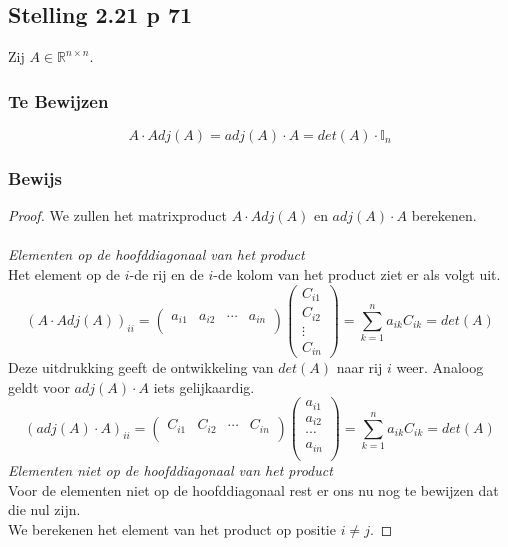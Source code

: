 \documentclass[lineaire_algebra_oplossingen.tex]{subfiles}
\begin{document}
\subsection{Stelling 2.21 p 71}
\label{2.21}
Zij $A \in \mathbb{R}^{n\times n}$.

\subsubsection*{Te Bewijzen}
\[
A\cdot Adj(A) = adj(A) \cdot A = det(A)\cdot\mathbb{I}_n
\]

\subsubsection*{Bewijs}
\begin{proof}
We zullen het matrixproduct $A\cdot Adj(A)$ en $adj(A) \cdot A$ berekenen.\\\\
\emph{Elementen op de hoofddiagonaal van het product}\\
Het element op de $i$-de rij en de $i$-de kolom van het product ziet er als volgt uit.
\[
(A\cdot Adj(A))_{ii} =
\begin{pmatrix}
a_{i1} & a_{i2}&\cdots&a_{in}\\
\end{pmatrix}
\begin{pmatrix}
C_{i1}\\C_{i2}\\\vdots\\C_{in}
\end{pmatrix}
=
\sum_{k=1}^na_{ik}C_{ik} = det(A)
\]
Deze uitdrukking geeft de ontwikkeling van $det(A)$ naar rij $i$ weer.
Analoog geldt voor $adj(A) \cdot A$ iets gelijkaardig.
\[
(adj(A) \cdot A)_{ii} =
\begin{pmatrix}
C_{i1}&C_{i2}&\cdots&C_{in}\\
\end{pmatrix}
\begin{pmatrix}
a_{i1}\\a_{i2}\\\cdots\\a_{in}\\
\end{pmatrix}
=
\sum_{k=1}^na_{ik}C_{ik} = det(A)
\]
\emph{Elementen niet op de hoofddiagonaal van het product}\\
Voor de elementen niet op de hoofddiagonaal rest er ons nu nog te bewijzen dat die nul zijn.\\
We berekenen het element van het product op positie $i\neq j$.

\end{proof}
\end{document}

